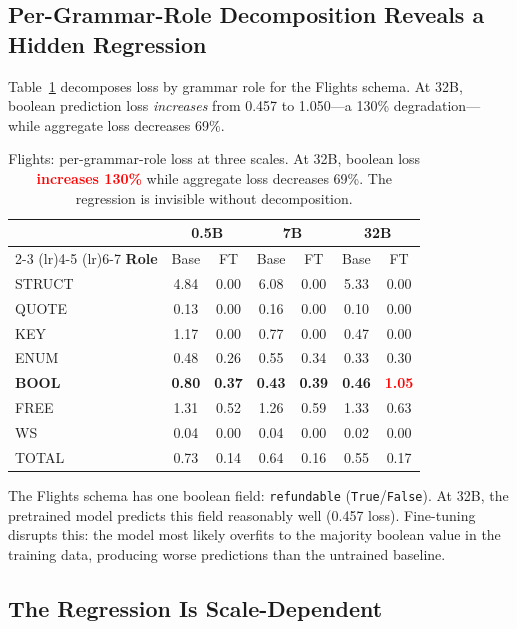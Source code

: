\documentclass[11pt]{article}
\newcommand{\regress}[1]{\textcolor{red}{\textbf{#1}}}
\begin{document}
\subsection{Per-Grammar-Role Decomposition Reveals a Hidden Regression}

Table~\ref{tab:flights_decomp} decomposes loss by grammar role for the Flights schema. At 32B, boolean prediction loss \emph{increases} from 0.457 to 1.050---a 130\% degradation---while aggregate loss decreases 69\%.

\begin{table}[t]
\centering
\small
\begin{tabular}{lcccccc}
\toprule
 & \multicolumn{2}{c}{\textbf{0.5B}} & \multicolumn{2}{c}{\textbf{7B}} & \multicolumn{2}{c}{\textbf{32B}} \\
\cmidrule(lr){2-3} \cmidrule(lr){4-5} \cmidrule(lr){6-7}
\textbf{Role} & Base & FT & Base & FT & Base & FT \\
\midrule
STRUCT  & 4.84 & 0.00 & 6.08 & 0.00 & 5.33 & 0.00 \\
QUOTE   & 0.13 & 0.00 & 0.16 & 0.00 & 0.10 & 0.00 \\
KEY     & 1.17 & 0.00 & 0.77 & 0.00 & 0.47 & 0.00 \\
ENUM    & 0.48 & 0.26 & 0.55 & 0.34 & 0.33 & 0.30 \\
\textbf{BOOL} & \textbf{0.80} & \textbf{0.37} & \textbf{0.43} & \textbf{0.39} & \textbf{0.46} & \regress{1.05} \\
FREE    & 1.31 & 0.52 & 1.26 & 0.59 & 1.33 & 0.63 \\
WS      & 0.04 & 0.00 & 0.04 & 0.00 & 0.02 & 0.00 \\
\midrule
TOTAL   & 0.73 & 0.14 & 0.64 & 0.16 & 0.55 & 0.17 \\
\bottomrule
\end{tabular}
\caption{Flights: per-grammar-role loss at three scales. At 32B, boolean loss \regress{increases 130\%} while aggregate loss decreases 69\%. The regression is invisible without decomposition.}
\label{tab:flights_decomp}
\end{table}

The Flights schema has one boolean field: \texttt{refundable} (\texttt{True}/\texttt{False}). At 32B, the pretrained model predicts this field reasonably well (0.457 loss). Fine-tuning disrupts this: the model most likely overfits to the majority boolean value in the training data, producing worse predictions than the untrained baseline. 

\subsection{The Regression Is Scale-Dependent}
\end{document}
